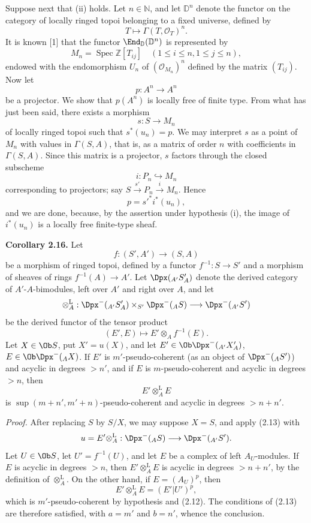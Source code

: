 \documentclass[11pt]{article}
\newcommand{\Spec}{\operatorname{Spec}}
\begin{document}
Suppose next that (ii) holds. Let \(n\in\mathbb N\), and let \(\mathbb D^n\) denote the functor on the category of locally ringed topoi belonging to a fixed universe, defined by
\[
  T\longmapsto \Gamma(T,\mathcal O_T)^n.
\]
It is known [1] that the functor \(\End_{\mathbb D}(\mathbb D^n)\) is represented by
\[
  M_n=\Spec\mathbb Z[T_{ij}]\quad(1\leq i\leq n,
  1\leq j\leq n),
\]
endowed with the endomorphism \(U_n\) of \((\mathcal O_{M_n})^n\) defined by the matrix \((T_{ij})\). Now let
\[
  p:A^n\longrightarrow A^n
\]
be a projector. We show that \(p(A^n)\) is locally free of finite type. From what has just been said, there exists a morphism
\[
  s:S\longrightarrow M_n
\]
of locally ringed topoi such that \(s^*(u_n)=p\). We may interpret \(s\) as a point of \(M_n\) with values in \(\Gamma(S,A)\), that is, as a matrix of order \(n\) with coefficients in \(\Gamma(S,A)\). Since this matrix is a projector, \(s\) factors through the closed subscheme
\[
  i:P_n\hookrightarrow M_n
\]
corresponding to projectors; say \(S\xrightarrow{s'}P_n\xrightarrow{i}M_n\). Hence
\[
  p=s'^* i^*(u_n),
\]
and we are done, because, by the assertion under hypothesis (i), the image of \(i^*(u_n)\) is a locally free finite-type sheaf.

\textbf{Corollary 2.16.} Let
\[
  f:(S',A')\longrightarrow (S,A)
\]
be a morphism of ringed topoi, defined by a functor \(f^{-1}:S\to S'\) and a morphism of sheaves of rings \(f^{-1}(A)\to A'\). Let \(\Dpx(_{A'}S'_A)\) denote the derived category of \(A'\)-\(A\)-bimodules, left over \(A'\) and right over \(A\), and let
\[
  \otimes_A^{\mathrm L}:\Dpx^-(_{A'}S'_A)\times_{S'}\Dpx^-(_A S)
  \longrightarrow \Dpx^-(_{A'}S')
\]
be the derived functor of the tensor product
\[
  (E',E)\longmapsto E'\otimes_A f^{-1}(E).
\]
Let \(X\in\Ob S\), put \(X'=u(X)\), and let \(E'\in\Ob\Dpx^-(_{A'}X'_A)\), \(E\in\Ob\Dpx^-(_A X)\). If \(E'\) is \(m'\)-pseudo-coherent (as an object of \(\Dpx^-(_A S')\)) and acyclic in degrees \(>n'\), and if \(E\) is \(m\)-pseudo-coherent and acyclic in degrees \(>n\), then
\[
  E'\otimes_A^{\mathrm L}E
\]
is \(\sup(m+n',m'+n)\)-pseudo-coherent and acyclic in degrees \(>n+n'\).

\emph{Proof.} After replacing \(S\) by \(S/X\), we may suppose \(X=S\), and apply (2.13) with
\[
  u=E'\otimes_A^{\mathrm L}:\Dpx^-(_A S)\longrightarrow \Dpx^-(_{A'}S').
\]
Let \(U\in\Ob S\), let \(U'=f^{-1}(U)\), and let \(E\) be a complex of left \(A_U\)-modules. If \(E\) is acyclic in degrees \(>n\), then \(E'\otimes_A^{\mathrm L}E\) is acyclic in degrees \(>n+n'\), by the definition of \(\otimes_A^{\mathrm L}\). On the other hand, if \(E=(A_U)^p\), then
\[
  E'\otimes_A^{\mathrm L}E=(E'|U')^p,
\]
which is \(m'\)-pseudo-coherent by hypothesis and (2.12). The conditions of (2.13) are therefore satisfied, with \(a=m'\) and \(b=n'\), whence the conclusion.
\end{document}
